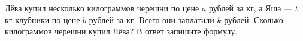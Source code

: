 \begin{ex}
	\begin{condition}
		Лёва купил несколько килограммов черешни по цене \( a \) рублей за кг, а
		Яша --- \( t \) кг клубники по цене \( b \) рублей за кг. Всего они заплатили \( k \) рублей. Сколько
		килограммов черешни купил Лёва? В ответ запишите формулу.
	\end{condition}
\end{ex}